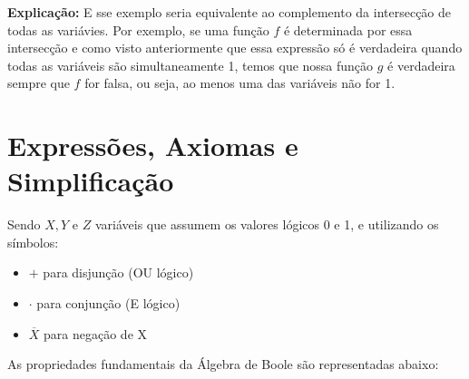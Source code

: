 \documentclass[12pt]{article}
\begin{document}
\textbf{Explicação:} E sse exemplo seria equivalente ao complemento da intersecção de todas as variávies. Por exemplo,  se uma função $f$  é determinada por essa intersecção e como visto anteriormente que essa expressão só é verdadeira quando todas as variáveis são simultaneamente 1, temos que nossa função $g$ é verdadeira sempre que $f$ for falsa, ou seja, ao menos uma das variáveis não for 1. 

\vspace{0.5cm}

\section{Expressões, Axiomas e Simplificação}

Sendo \( X, Y\) e \( Z\) variáveis que assumem os valores lógicos 0 e 1, e utilizando os símbolos:
\begin{itemize}
   \item \( + \) para disjunção (OU lógico)
   \item \( \cdot \) para conjunção (E lógico)
   \item \( \overline{X} \) para negação de X
\end{itemize}

As propriedades fundamentais da Álgebra de Boole são representadas abaixo:
\end{document}
